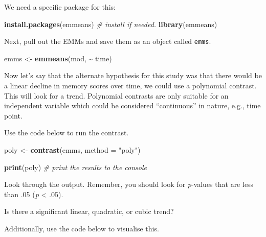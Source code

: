\documentclass[
]{book}
\newenvironment{Shaded}{\begin{snugshade}}{\end{snugshade}}
\newcommand{\AttributeTok}[1]{\textcolor[rgb]{0.13,0.29,0.53}{#1}}
\newcommand{\CommentTok}[1]{\textcolor[rgb]{0.56,0.35,0.01}{\textit{#1}}}
\newcommand{\FunctionTok}[1]{\textcolor[rgb]{0.13,0.29,0.53}{\textbf{#1}}}
\newcommand{\NormalTok}[1]{#1}
\newcommand{\OtherTok}[1]{\textcolor[rgb]{0.56,0.35,0.01}{#1}}
\newcommand{\SpecialCharTok}[1]{\textcolor[rgb]{0.81,0.36,0.00}{\textbf{#1}}}
\newcommand{\StringTok}[1]{\textcolor[rgb]{0.31,0.60,0.02}{#1}}
\begin{document}
We need a specific package for this:

\begin{Shaded}
\begin{Highlighting}[]
\FunctionTok{install.packages}\NormalTok{(emmeans) }\CommentTok{\# install if needed.}
\FunctionTok{library}\NormalTok{(emmeans)}
\end{Highlighting}
\end{Shaded}

Next, pull out the EMMs and save them as an object called \texttt{emms}.

\begin{Shaded}
\begin{Highlighting}[]
\NormalTok{emms }\OtherTok{\textless{}{-}} \FunctionTok{emmeans}\NormalTok{(mod, }\SpecialCharTok{\textasciitilde{}}\NormalTok{ time)}
\end{Highlighting}
\end{Shaded}

Now let's say that the alternate hypothesis for this study was that there would be a linear decline in memory scores over time, we could use a polynomial contrast. This will look for a trend. Polynomial contrasts are only suitable for an independent variable which could be considered ``continuous'' in nature, e.g., time point.

Use the code below to run the contrast.

\begin{Shaded}
\begin{Highlighting}[]
\NormalTok{poly }\OtherTok{\textless{}{-}} \FunctionTok{contrast}\NormalTok{(emms, }\AttributeTok{method =} \StringTok{"poly"}\NormalTok{)}

\FunctionTok{print}\NormalTok{(poly) }\CommentTok{\# print the results to the console}
\end{Highlighting}
\end{Shaded}

Look through the output. Remember, you should look for \emph{p}-values that are less than .05 (\emph{p} \textless{} .05).

Is there a significant linear, quadratic, or cubic trend?

Additionally, use the code below to visualise this.
\end{document}
